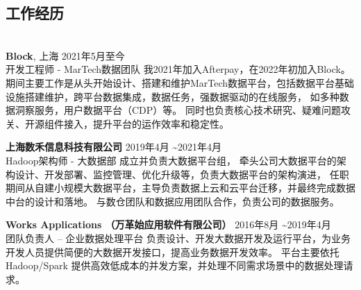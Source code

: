 \documentclass{res}[8.5pt]
\begin{document}
        \thispagestyle{empty} %

        \address{{\bf 地址:} 虹口区天宝路466弄, 200086 \hspace{0.25in}  {\bf 电话:} 18017661124 \hspace{0.25in}  {\bf   Email:} dd.famous@gmail.com}

        \begin{resume}
                \vspace{-12pt}
                \section{{工作经历}}
                \vspace{-12pt}
                \hrulefill\\
                {\bf Block}, 上海 \hfill 2021年5月至今 \\
                开发工程师 - MarTech数据团队  \hspace{0.25in} 我2021年加入Afterpay，在2022年初加入Block。
                期间主要工作是从头开始设计、搭建和维护MarTech数据平台，包括数据平台基础设施搭建维护，跨平台数据集成，数据任务，强数据驱动的在线服务，
                如多种数据洞察服务，用户数据平台（CDP）等。
                同时也负责核心技术研究、疑难问题攻关、开源组件接入，提升平台的运作效率和稳定性。

                \vspace{-10pt}
                {\bf 上海数禾信息科技有限公司} \hfill 2019年4月  \textasciitilde 2021年4月\\
                Hadoop架构师 - 大数据部    \hspace{0.25in}
                成立并负责大数据平台组，
                牵头公司大数据平台的架构设计、开发部署、监控管理、优化升级等，负责大数据平台的架构演进，
                任职期间从自建小规模大数据平台，主导负责数据上云和云平台迁移，并最终完成数据中台的设计和落地。
                与数仓团队和数据应用团队合作，负责公司的数据服务。

                \vspace{-10pt}
                {\bf Works Applications （万革始应用软件有限公司）} \hfill 2016年8月 \textasciitilde 2019年4月\\
                团队负责人 – 企业数据处理平台 \hspace{0.25in}
                负责设计、开发大数据开发及运行平台，为业务开发人员提供简便的大数据开发接口，提高业务数据开发效率。
                平台主要依托 Hadoop/Spark 提供高效低成本的并发方案，并处理不同需求场景中的数据处理请求。


\end{resume}
\end{document}
